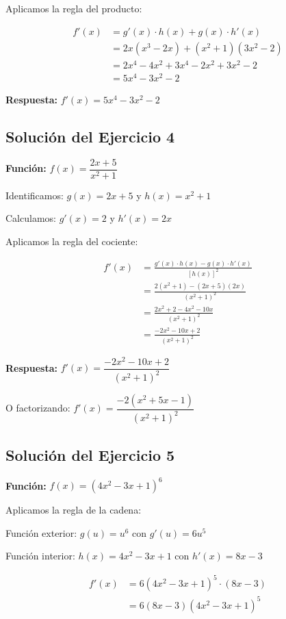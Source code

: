 \documentclass[12pt,a4paper]{article}
\begin{document}
Aplicamos la regla del producto:

\begin{align*}
f'(x) &= g'(x) \cdot h(x) + g(x) \cdot h'(x) \\
&= 2x(x^3 - 2x) + (x^2 + 1)(3x^2 - 2) \\
&= 2x^4 - 4x^2 + 3x^4 - 2x^2 + 3x^2 - 2 \\
&= 5x^4 - 3x^2 - 2
\end{align*}

\textbf{Respuesta:} $\boxed{f'(x) = 5x^4 - 3x^2 - 2}$

\subsection*{Solución del Ejercicio 4}

\textbf{Función:} $f(x) = \dfrac{2x + 5}{x^2 + 1}$

\bigskip

Identificamos: $g(x) = 2x + 5$ y $h(x) = x^2 + 1$

Calculamos: $g'(x) = 2$ y $h'(x) = 2x$

Aplicamos la regla del cociente:

\begin{align*}
f'(x) &= \frac{g'(x) \cdot h(x) - g(x) \cdot h'(x)}{[h(x)]^2} \\
&= \frac{2(x^2 + 1) - (2x + 5)(2x)}{(x^2 + 1)^2} \\
&= \frac{2x^2 + 2 - 4x^2 - 10x}{(x^2 + 1)^2} \\
&= \frac{-2x^2 - 10x + 2}{(x^2 + 1)^2}
\end{align*}

\textbf{Respuesta:} $\boxed{f'(x) = \dfrac{-2x^2 - 10x + 2}{(x^2 + 1)^2}}$

O factorizando: $\boxed{f'(x) = \dfrac{-2(x^2 + 5x - 1)}{(x^2 + 1)^2}}$

\subsection*{Solución del Ejercicio 5}

\textbf{Función:} $f(x) = (4x^2 - 3x + 1)^6$

\bigskip

Aplicamos la regla de la cadena:

Función exterior: $g(u) = u^6$ con $g'(u) = 6u^5$

Función interior: $h(x) = 4x^2 - 3x + 1$ con $h'(x) = 8x - 3$

\begin{align*}
f'(x) &= 6(4x^2 - 3x + 1)^5 \cdot (8x - 3) \\
&= 6(8x - 3)(4x^2 - 3x + 1)^5
\end{align*}
\end{document}

